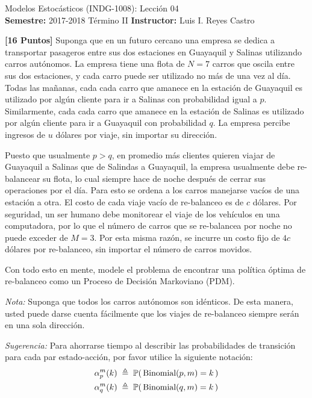 \documentclass[ a4paper, twoside, 11pt]{article}
\newcommand{\numero}{04}
\begin{document}
\allowdisplaybreaks



\begin{center}
\Large Modelos Estoc\'asticos (INDG-1008): Lecci\'on \numero \\[2ex]
\small \textbf{Semestre:} 2017-2018 T\'ermino II \qquad
\textbf{Instructor:} Luis I. Reyes Castro
\end{center}
\fullskip

\begin{problem}
\textbf{[16 Puntos]} Suponga que en un futuro cercano una empresa se dedica a transportar pasageros entre sus dos estaciones en Guayaquil y Salinas utilizando carros aut\'onomos. \linebreak La empresa tiene una flota de $N = 7$ carros que oscila entre sus dos estaciones, y cada carro puede ser utilizado no m\'as de una vez al d\'ia. Todas las ma\~nanas, cada cada carro que amanece en la estaci\'on de Guayaquil es utilizado por alg\'un cliente para ir a Salinas con probabilidad igual a $p$. Similarmente, cada cada carro que amanece en la estaci\'on de Salinas es utilizado por alg\'un cliente para ir a Guayaquil con probabilidad $q$. La empresa percibe ingresos de $u$ d\'olares por viaje, sin importar su direcci\'on. 

Puesto que usualmente $p > q$, \ie en promedio m\'as clientes quieren viajar de Guayaquil a Salinas que de Salindas a Guayaquil, la empresa usualmente debe re-balancear su flota, lo cual siempre hace de noche despu\'es de cerrar sus operaciones por el d\'ia. Para esto se ordena a los carros manejarse vac\'ios de una estaci\'on a otra. El costo de cada viaje vac\'io de re-balanceo es de $c$ d\'olares. Por seguridad, un ser humano debe monitorear el viaje de los veh\'iculos en una computadora, por lo que el n\'umero de carros que se re-balancea por noche no puede exceder de $M = 3$. Por esta misma raz\'on, se incurre un costo fijo de $4c$ d\'olares por re-balanceo, sin importar el n\'umero de carros movidos. 

Con todo esto en mente, modele el problema de encontrar una pol\'itica \'optima de re-balanceo como un Proceso de Decisi\'on Markoviano (PDM). 

\emph{Nota:} Suponga que todos los carros aut\'onomos son id\'enticos. De esta manera, usted puede darse cuenta f\'acilmente que los viajes de re-balanceo siempre ser\'an en una sola direcci\'on. 

\emph{Sugerencia:} Para ahorrarse tiempo al describir las probabilidades de transici\'on para cada par estado-acci\'on, por favor utilice la siguiente notaci\'on: 
\begin{align*}
\alpha_p^m(k) \; & \triangleq \; \mathbb{P}( \, \text{Binomial}(p,m) = k \, ) \\
\alpha_q^m(k) \; & \triangleq \; \mathbb{P}( \, \text{Binomial}(q,m) = k \, )
\end{align*}

\end{problem}
\fullskip
\end{document}
